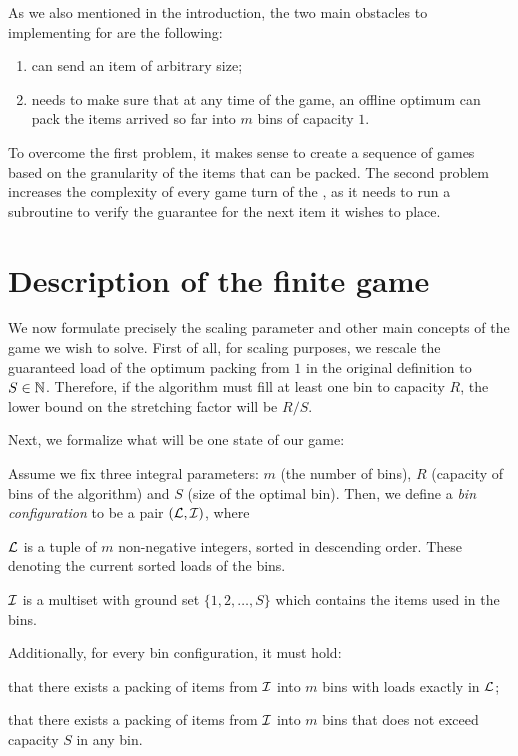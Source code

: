 As we also mentioned in the introduction, the two main obstacles to
implementing \minimax for \binstretch are the following:

\begin{enumerate}
\item \adversary can send an item of arbitrary  size;
\item \adversary needs to make sure that at any time of the game, an offline
  optimum can pack the items arrived so far into $m$ bins of capacity $1$.
\end{enumerate}

To overcome the first problem, it makes sense to create a sequence of
games based on the granularity of the items that can be packed.  The
second problem increases the complexity of every game turn of the
\adversary, as it needs to run a subroutine to verify the guarantee
for the next item it wishes to place.

\section{Description of the finite game}

We now formulate precisely the scaling parameter and other main
concepts of the game we wish to solve. First of all, for scaling
purposes, we rescale the guaranteed load of the optimum packing from
$1$ in the original definition to $S \in \mathbb{N}$. Therefore, if the
algorithm must fill at least one bin to capacity $R$, the lower bound
on the stretching factor will be $R/S$.

Next, we formalize what will be one state of our game:

\begin{dfn}\label{dfn:binconf}
  Assume we fix three integral parameters: $m$ (the number of bins), $R$ (capacity of bins of the algorithm)
and $S$ (size of the optimal bin). Then, we define a \emph{bin configuration} to be a pair
  $({\mathcal L},{\mathcal I})$, where
  \begin{compactitem}
    \item ${\mathcal L}$ is a tuple of $m$ non-negative integers, sorted in descending order. These denoting the current sorted loads of the bins.
    \item ${\mathcal I}$ is a multiset with ground set $\{1,2,\ldots,S\}$ which contains the items used in the bins.
  \end{compactitem}

  Additionally, for every bin configuration, it must hold:
  \begin{compactitem}
    \item that there exists a packing of items from ${\mathcal I}$ into $m$ bins with loads exactly in ${\mathcal L}$;
    \item that there exists a packing of items from ${\mathcal I}$ into $m$ bins that does not exceed capacity $S$ in any bin.
  \end{compactitem}  
\end{dfn}

